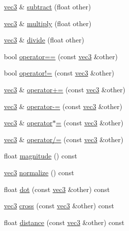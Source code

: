 \begin{DoxyCompactItemize}
\item 
\hyperlink{structspork_1_1maths_1_1vec3}{vec3} \& \hyperlink{structspork_1_1maths_1_1vec3_a4200a71e3a63aad760cfa425f0d7de8a}{subtract} (float other)
\item 
\hyperlink{structspork_1_1maths_1_1vec3}{vec3} \& \hyperlink{structspork_1_1maths_1_1vec3_a8e0548e67ce8bbc8487e9d8a8b140dec}{multiply} (float other)
\item 
\hyperlink{structspork_1_1maths_1_1vec3}{vec3} \& \hyperlink{structspork_1_1maths_1_1vec3_a951e89900a7a9034c65fb84ea6dfc9ae}{divide} (float other)
\item 
bool \hyperlink{structspork_1_1maths_1_1vec3_a5251f074a2049d02a9c7edb66a9b3596}{operator==} (const \hyperlink{structspork_1_1maths_1_1vec3}{vec3} \&other)
\item 
bool \hyperlink{structspork_1_1maths_1_1vec3_a668814674a68610b637e01414a2f02b3}{operator!=} (const \hyperlink{structspork_1_1maths_1_1vec3}{vec3} \&other)
\item 
\hyperlink{structspork_1_1maths_1_1vec3}{vec3} \& \hyperlink{structspork_1_1maths_1_1vec3_a43b3a607009f36bace4c5052d2704722}{operator+=} (const \hyperlink{structspork_1_1maths_1_1vec3}{vec3} \&other)
\item 
\hyperlink{structspork_1_1maths_1_1vec3}{vec3} \& \hyperlink{structspork_1_1maths_1_1vec3_a02ebc782e426799b5d664b796119eb71}{operator-\/=} (const \hyperlink{structspork_1_1maths_1_1vec3}{vec3} \&other)
\item 
\hyperlink{structspork_1_1maths_1_1vec3}{vec3} \& \hyperlink{structspork_1_1maths_1_1vec3_a694ed540bafe10f65016d143bfd9fb36}{operator$\ast$=} (const \hyperlink{structspork_1_1maths_1_1vec3}{vec3} \&other)
\item 
\hyperlink{structspork_1_1maths_1_1vec3}{vec3} \& \hyperlink{structspork_1_1maths_1_1vec3_a8574d097b6a04613a97c7eabdf315309}{operator/=} (const \hyperlink{structspork_1_1maths_1_1vec3}{vec3} \&other)
\item 
float \hyperlink{structspork_1_1maths_1_1vec3_a6182e62de893da8a75430d69a43c3799}{magnitude} () const
\item 
\hyperlink{structspork_1_1maths_1_1vec3}{vec3} \hyperlink{structspork_1_1maths_1_1vec3_ae18f204e08b6a509e4b68aa347ec5b1c}{normalize} () const
\item 
float \hyperlink{structspork_1_1maths_1_1vec3_a2261ddda8375f01b33a0abd532c0c915}{dot} (const \hyperlink{structspork_1_1maths_1_1vec3}{vec3} \&other) const
\item 
\hyperlink{structspork_1_1maths_1_1vec3}{vec3} \hyperlink{structspork_1_1maths_1_1vec3_a94bddcfa1c5db496698f37564df5856d}{cross} (const \hyperlink{structspork_1_1maths_1_1vec3}{vec3} \&other) const
\item 
float \hyperlink{structspork_1_1maths_1_1vec3_a9196265ff8b731368caaea9b0ae87147}{distance} (const \hyperlink{structspork_1_1maths_1_1vec3}{vec3} \&other) const
\end{DoxyCompactItemize}
